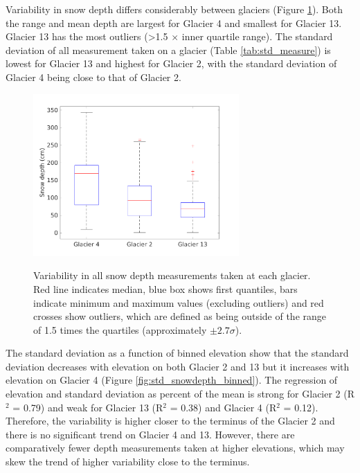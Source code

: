 \documentclass{sfuthesis}
\begin{document}
\begin{appendices}
Variability in snow depth differs considerably between glaciers (Figure \ref{fig:box_depth}). Both the range and mean depth are largest for Glacier 4 and smallest for Glacier 13. Glacier 13 has the most outliers (\textgreater 1.5 $\times$ inner quartile range). The standard deviation of all measurement taken on a glacier (Table \ref{tab:std_measure}) is lowest for Glacier 13 and highest for Glacier 2, with the standard deviation of Glacier 4 being close to that of Glacier 2. 


\begin{figure} 
\centering
	\includegraphics[width = 0.7\textwidth]{box_depth.png}\\
	\caption[]{Variability in all snow depth measurements taken at each glacier. Red line indicates median, blue box shows first quantiles, bars indicate minimum and maximum values (excluding outliers) and red crosses show outliers, which are defined as being outside of the range of 1.5 times the quartiles (approximately $\pm2.7\sigma$).}
	\label{fig:box_depth}
\end{figure}

The standard deviation as a function of binned elevation show that the standard deviation decreases with elevation on both Glacier 2 and 13 but it increases with elevation on Glacier 4 (Figure \ref{fig:std_snowdepth_binned}). The regression of elevation and standard deviation as percent of the mean is strong for Glacier 2 (R$^2$ = 0.79) and weak for Glacier 13 (R$^2$ = 0.38) and Glacier 4 (R$^2$ = 0.12). Therefore, the variability is higher closer to the terminus of the Glacier 2 and there is no significant trend on Glacier 4 and 13. However, there are comparatively fewer depth measurements taken at higher elevations, which may skew the trend of higher variability close to the terminus. 


\end{appendices}
\end{document}
